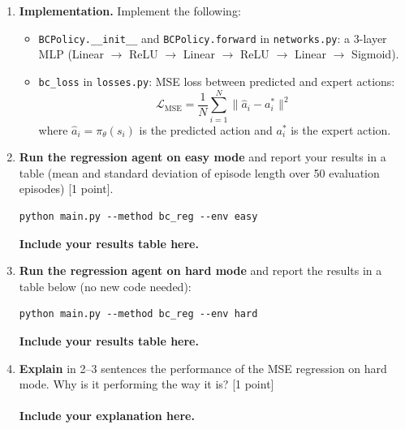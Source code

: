 \documentclass[12pt]{article}
\begin{document}
\begin{enumerate}

\item \textbf{Implementation.} Implement the following:
\begin{itemize}
    \item \texttt{BCPolicy.\_\_init\_\_} and \texttt{BCPolicy.forward} in \texttt{networks.py}: a 3-layer MLP (Linear $\to$ ReLU $\to$ Linear $\to$ ReLU $\to$ Linear $\to$ Sigmoid).
    \item \texttt{bc\_loss} in \texttt{losses.py}: MSE loss between predicted and expert actions:
    \begin{equation}
        \mathcal{L}_{\text{MSE}} = \frac{1}{N} \sum_{i=1}^{N} \| \hat{a}_i - a_i^* \|^2
    \end{equation}
    where $\hat{a}_i = \pi_\theta(s_i)$ is the predicted action and $a_i^*$ is the expert action.
\end{itemize}

\item \textbf{Run the regression agent on easy mode} and report your results in a table (mean and standard deviation of episode length over 50 evaluation episodes) [1 point].

\begin{tcolorbox}[width=\linewidth, sharp corners=all, colback=white!95!black]
\begin{verbatim}
python main.py --method bc_reg --env easy
\end{verbatim}
\end{tcolorbox}

\textbf{\color{red}Include your results table here.}

\item \textbf{Run the regression agent on hard mode} and report the results in a table below (no new code needed):

\begin{tcolorbox}[width=\linewidth, sharp corners=all, colback=white!95!black]
\begin{verbatim}
python main.py --method bc_reg --env hard
\end{verbatim}
\end{tcolorbox}

\textbf{\color{red}Include your results table here.}


\item \textbf{Explain} in 2--3 sentences the performance of the MSE regression on hard mode. Why is it performing the way it is? [1 point]\\
\\
\textbf{\color{red}Include your explanation here.}
\end{enumerate}
\end{document}
